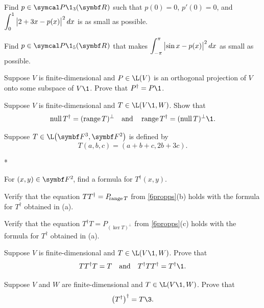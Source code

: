 \begin{exercises}
\exercise
Find $p \in \P\1_3(\R{})$ such that $p(0) = 0$, $p' \! (0) = 0$, and
$ \displaystyle
\int_0^1 \, \abs[\big]{2 + 3x - p(x)}^2 \,dx
$
is as small as possible.


\exercise
Find $p \in \P\1_5(\R{})$ that makes
$ \displaystyle
\int_{-\pi}^{\pi} \, \abs[\big]{\sin x - p(x)}^2\,dx
$
as small as possible.


\exercise
Suppose $V$ is finite-dimensional and $P \in \L(V)$ is an orthogonal projection of $V$ onto some subspace of $V\1$. Prove that $P^\dagger = P\1$.\label{3dagger}


\exercise
Suppose $V$ is finite-dimensional and $T \in \L(V\1, W)$. Show that \label{5NullRanTd}
\[
\ker T^\dagger = (\ran T)^\perp \andd \ran T^\dagger = (\ker T)^\perp\1.
\]
\exercisedisplayend


\exercise
Suppose $T \in \L\paren[\big]{ \F3, \F2 }$ is defined by
\[
T(a, b, c) = (a + b + c, 2b + 3c).
\]
\begin{subtheorem}*
\item
For $(x, y) \in \FF2$, find a formula for $T^\dagger(x,y)$.
\item
Verify that the equation $TT^\dagger = P_{\!\ran T}$ from \ref{6propps}(b) holds with the formula for $T^\dagger$ obtained in (a).
\item
Verify that the equation $T^\dagger T = P_{\!(\ker T)^\perp}$ from \ref{6propps}(c) holds with the formula for $T^\dagger$ obtained in (a).
\end{subtheorem}
\exercisesubtheoremend


\exercise
Suppose $V$ is finite-dimensional and $T \in \L(V\1, W)$. Prove that
\[
TT^\dagger T = T \andd T^\dagger T T^\dagger = T^\dagger\1.
\]
\exercisedisplayend
{}


\exercise
Suppose $V$ and $W$ are finite-dimensional and $T \in \L(V\1, W)$. Prove that\label{2dag}
\[
\paren[\big]{T^\dagger}^\dagger = T\3.
\]
\exercisedisplayend
{}


\end{exercises}

